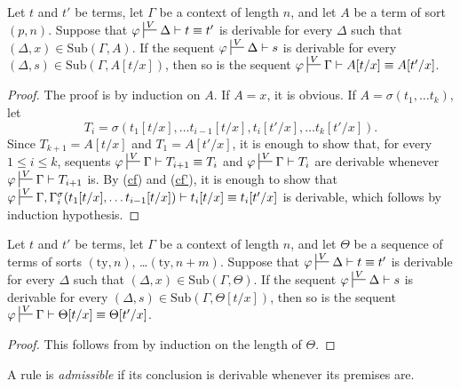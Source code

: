\documentclass[reqno]{amsart}
\newcommand{\axref}[1]{(\hyperref[ax:#1]{#1})}
\theoremstyle{definition}
\theoremstyle{remark}
\newcommand{\fs}[1]{\mathrm{#1}}
\newcommand{\ty}{\fs{ty}}
\newcommand{\sub}{\fs{Sub}}
\numberwithin{figure}{section}
\begin{document}
\begin{lem}
Let $t$ and $t'$ be terms, let $\Gamma$ be a context of length $n$, and let $A$ be a term of sort $(p,n)$.
Suppose that $\varphi \sststile{}{V} \Delta \vdash t \equiv t'$ is derivable for every $\Delta$ such that $(\Delta,x) \in \sub(\Gamma,A)$.
If the sequent $\varphi \sststile{}{V} \Delta \vdash s$ is derivable for every $(\Delta,s) \in \sub(\Gamma,A[t/x])$, then so is the sequent $\varphi \sststile{}{V} \Gamma \vdash A[t/x] \equiv A[t'/x]$.
\end{lem}
\begin{proof}
The proof is by induction on $A$.
If $A = x$, it is obvious.
If $A = \sigma(t_1, \ldots t_k)$, let
\[ T_i = \sigma(t_1[t/x], \ldots t_{i-1}[t/x], t_i[t'/x], \ldots t_k[t'/x]). \]
Since $T_{k+1} = A[t/x]$ and $T_1 = A[t'/x]$, it is enough to show that, for every $1 \leq i \leq k$, sequents $\varphi \sststile{}{V} \Gamma \vdash T_{i+1} \equiv T_i$ and $\varphi \sststile{}{V} \Gamma \vdash T_i$ are derivable whenever $\varphi \sststile{}{V} \Gamma \vdash T_{i+1}$ is.
By \axref{cf} and \axref{cf'}, it is enough to show that $\varphi \sststile{}{V} \Gamma, \Gamma^\sigma_i(t_1[t/x], \ldots t_{i-1}[t/x]) \vdash t_i[t/x] \equiv t_i[t'/x]$ is derivable, which follows by induction hypothesis.
\end{proof}

\begin{lem}
Let $t$ and $t'$ be terms, let $\Gamma$ be a context of length $n$, and let $\Theta$ be a sequence of terms of sorts $(\ty,n)$, \ldots $(\ty,n+m)$.
Suppose that $\varphi \sststile{}{V} \Delta \vdash t \equiv t'$ is derivable for every $\Delta$ such that $(\Delta,x) \in \sub(\Gamma,\Theta)$.
If the sequent $\varphi \sststile{}{V} \Delta \vdash s$ is derivable for every $(\Delta,s) \in \sub(\Gamma,\Theta[t/x])$, then so is the sequent $\varphi \sststile{}{V} \Gamma \vdash \Theta[t/x] \equiv \Theta[t'/x]$.
\end{lem}
\begin{proof}
This follows from  by induction on the length of $\Theta$.
\end{proof}

A rule is \emph{admissible} if its conclusion is derivable whenever its premises are.
\end{document}
